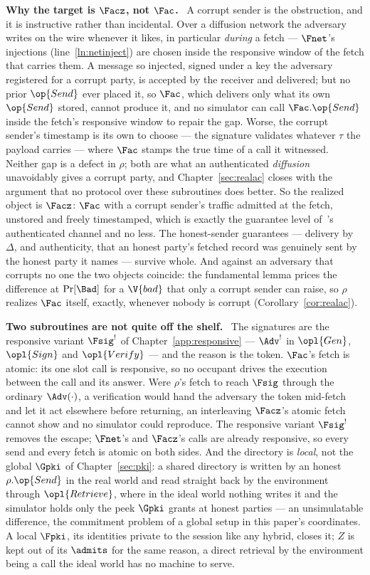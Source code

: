 \documentclass[10pt,oneside,openany]{book}
\newcommand{\heading}[1]{\medskip\par\noindent\textcolor{accent}{\textbf{#1.}}\ }
\theoremstyle{accentdef}
\theoremstyle{accentplain}
\begin{document}
\heading{Why the target is $\Facz$, not $\Fac$} A corrupt sender is the obstruction, and it is
instructive rather than incidental. Over a diffusion network the adversary writes on the wire
whenever it likes, in particular \emph{during} a fetch --- $\Fnet$'s injections
(line~\ref{ln:netinject}) are chosen inside the responsive window of the fetch that carries them.
A message so injected, signed under a key the adversary registered for a corrupt party, is
accepted by the receiver and delivered; but no prior $\op{Send}$ ever placed it, so $\Fac$, which
delivers only what its own $\op{Send}$ stored, cannot produce it, and no simulator can call
$\Fac.\op{Send}$ inside the fetch's responsive window to repair the gap. Worse, the corrupt
sender's timestamp is its own to choose --- the signature validates whatever $\tau$ the payload
carries --- where $\Fac$ stamps the true time of a call it witnessed. Neither gap is a defect in
$\rho$; both are what an authenticated \emph{diffusion} unavoidably gives a corrupt party, and
Chapter~\ref{sec:realac} closes with the argument that no protocol over these subroutines does
better. So the realized object is $\Facz$: $\Fac$ with a corrupt sender's traffic admitted at the
fetch, unstored and freely timestamped, which is exactly the guarantee level
of~\cite{Canetti20}'s authenticated channel and no less. The honest-sender guarantees ---
delivery by $\Delta$, and authenticity, that an honest party's fetched record was genuinely sent
by the honest party it names --- survive whole. And against an adversary that corrupts no one the
two objects coincide: the fundamental lemma prices the difference at $\Pr[\Bad]$ for a $\V{bad}$
that only a corrupt sender can raise, so $\rho$ realizes $\Fac$ itself, exactly, whenever nobody
is corrupt (Corollary~\ref{cor:realac}).

\heading{Two subroutines are not quite off the shelf} The signatures are the responsive variant
$\Fsig^{!}$ of Chapter~\ref{app:responsive} --- $\Adv^{!}$ in $\opl{Gen}$, $\opl{Sign}$ and
$\opl{Verify}$ --- and the reason is the token. $\Fac$'s fetch is atomic: its one slot call is
responsive, so no occupant drives the execution between the call and its answer. Were $\rho$'s
fetch to reach $\Fsig$ through the ordinary $\Adv(\cdot)$, a verification would hand the adversary
the token mid-fetch and let it act elsewhere before returning, an interleaving $\Facz$'s atomic
fetch cannot show and no simulator could reproduce. The responsive variant $\Fsig^{!}$ removes the escape; $\Fnet$'s and
$\Facz$'s calls are already responsive, so every send and every fetch is atomic on both sides.
And the directory is \emph{local}, not the global $\Gpki$ of Chapter~\ref{sec:pki}: a shared
directory is written by an honest $\rho.\op{Send}$ in the real world and read straight back by the
environment through $\opl{Retrieve}$, where in the ideal world nothing writes it and the simulator
holds only the peek $\Gpki$ grants at honest parties --- an unsimulatable difference, the
commitment problem of a global setup in this paper's coordinates. A local $\Fpki$, its identities
private to the session like any hybrid, closes it; $Z$ is kept out of its $\admits$ for the same
reason, a direct retrieval by the environment being a call the ideal world has no machine to
serve.
\end{document}
